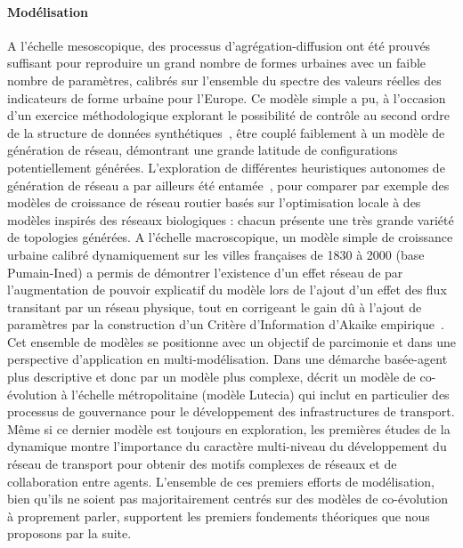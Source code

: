 \paragraph{Modélisation}

A l'échelle mesoscopique, des processus d'agrégation-diffusion ont été prouvés suffisant pour reproduire un grand nombre de formes urbaines avec un faible nombre de paramètres, calibrés sur l'ensemble du spectre des valeurs réelles des indicateurs de forme urbaine pour l'Europe. Ce modèle simple a pu, à l'occasion d'un exercice méthodologique explorant le possibilité de contrôle au second ordre de la structure de données synthétiques~\cite{raimbault2016generation}, être couplé faiblement à un modèle de génération de réseau, démontrant une grande latitude de configurations potentiellement générées. L'exploration de différentes heuristiques autonomes de génération de réseau a par ailleurs été entamée~\cite{raimbault2015labex}, pour comparer par exemple des modèles de croissance de réseau routier basés sur l'optimisation locale à des modèles inspirés des réseaux biologiques : chacun présente une très grande variété de topologies générées. A l'échelle macroscopique, un modèle simple de croissance urbaine calibré dynamiquement sur les villes françaises de 1830 à 2000 (base Pumain-Ined) a permis de démontrer l'existence d'un effet réseau de par l'augmentation de pouvoir explicatif du modèle lors de l'ajout d'un effet des flux transitant par un réseau physique, tout en corrigeant le gain dû à l'ajout de paramètres par la construction d'un Critère d'Information d'Akaike empirique~\cite{raimbault2016models}. Cet ensemble de modèles se positionne avec un objectif de parcimonie et dans une perspective d'application en multi-modélisation. Dans une démarche basée-agent plus descriptive et donc par un modèle plus complexe, \cite{le2015modeling} décrit un modèle de co-évolution à l'échelle métropolitaine (modèle Lutecia) qui inclut en particulier des processus de gouvernance pour le développement des infrastructures de transport. Même si ce dernier modèle est toujours en exploration, les premières études de la dynamique montre l'importance du caractère multi-niveau du développement du réseau de transport pour obtenir des motifs complexes de réseaux et de collaboration entre agents. L'ensemble de ces premiers efforts de modélisation, bien qu'ils ne soient pas majoritairement centrés sur des modèles de co-évolution à proprement parler, supportent les premiers fondements théoriques que nous proposons par la suite.



